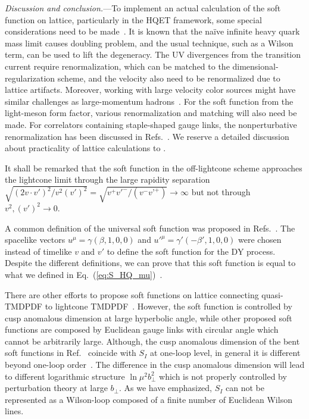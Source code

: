 \documentclass[twocolumn,aps,preprintnumbers,prd,superscriptaddress,10pt]{revtex4-1}
\begin{document}
{\it Discussion and conclusion.}---To implement an actual calculation
of the soft function on lattice, particularly in the HQET framework,
some special considerations need to be made~\cite{Aglietti:1993hf,Hashimoto:1995in,Horgan:2009ti}.
%
It is known that the na{\"i}ve infinite heavy quark mass limit causes doubling problem,
and the usual technique, such as a Wilson term, can be used to lift the degeneracy.
%
The UV divergences from the transition current require renormalization, which
can be matched to the dimensional-regularization scheme, and the velocity
also need to be renormalized due to lattice artifacts. Moreover,
working with large velocity color sources might have similar challenges
as large-momentum hadrons~\cite{Bali:2016lva}.
%
For the soft function from the light-meson form factor, various
renormalization and matching will also need be made.
%
For correlators containing staple-shaped gauge links, the nonperturbative renormalization has been discussed in Refs.~\cite{Ji:2019ewn,Shanahan:2019zcq,Ebert:2019tvc}.
%
We reserve a detailed discussion about practicality of lattice calculations
to \cite{future}.

It shall be remarked that the soft function in the off-lightcone scheme approaches the lightcone
limit through the large rapidity separation $\sqrt{(2v\cdot v')^2/v^2(v')^2}=\sqrt{v^+v'^-/(v^-v’^+)}\to \infty$
but not through $v^2, (v')^2 \rightarrow 0$.

A common definition of the universal soft function was proposed in Refs.~\cite{Collins:2011ca,Collins:2011zzd}. The spacelike vectors $u^\mu=\gamma(\beta,1,0,0)$ and $u'^\mu=\gamma'(-\beta',1,0,0)$ were chosen instead of timelike $v $ and $v'$ to define the soft function for the DY process.
%
Despite the different definitions, we can prove that this soft function is equal to what we defined in Eq.~(\ref{eq:S_HQ_mu})~\cite{future}.

There are other efforts to propose soft functions on lattice connecting quasi-TMDPDF to lightcone TMDPDF~\cite{Ji:2014hxa,Ji:2018hvs,Ebert:2019okf}.
%
However, the soft function is controlled by cusp anomalous dimension at large hyperbolic angle, while other proposed soft functions are composed by Euclidean gauge links with circular angle which cannot be arbitrarily large.
%
Although, the cusp anomalous dimension of the bent soft functions in Ref.~\cite{Ji:2014hxa,Ebert:2019okf} coincide with $S_I$ at one-loop level, in general it is different beyond one-loop order~\cite{Korchemsky:1987wg}.
%
The difference in the cusp anomalous dimension will lead to different logarithmic structure $\ln\mu^2b_\perp^2$ which is not properly controlled by perturbation theory at large $b_\perp$.
%
As we have emphasized, $S_I$ can not be represented as a Wilson-loop composed of a finite number of Euclidean Wilson lines.
\end{document}
